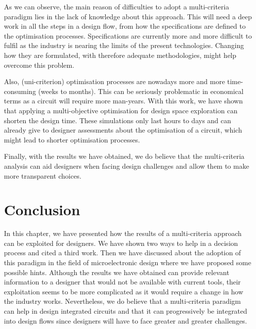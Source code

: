 As we can observe, the main reason of difficulties to adopt a multi-criteria paradigm lies in the lack of knowledge about this approach. This will need a deep work in all the steps in a design flow, from how the specifications are defined to the optimisation processes. Specifications are currently more and more difficult to fulfil as the industry is nearing the limits of the present technologies. Changing how they are formulated, with therefore adequate methodologies, might help overcome this problem.

Also, (uni-criterion) optimisation processes are nowadays more and more time-consuming (weeks to months). This can be seriously problematic in economical terms as a circuit will require more man-years. With this work, we have shown that applying a multi-objective optimisation for design space exploration can shorten the design time. These simulations only last hours to days and can already give to designer assessments about the optimisation of a circuit, which might lead to shorter optimisation processes.

Finally, with the results we have obtained, we do believe that the multi-criteria analysis can aid designers when facing design challenges and allow them to make more transparent choices.

\section{Conclusion}
In this chapter, we have presented how the results of a multi-criteria approach can be exploited for designers. We have shown two ways to help in a decision process and cited a third work. Then we have discussed about the adoption of this paradigm in the field of microelectronic design where we have proposed some possible hints. Although the results we have obtained can provide relevant information to a designer that would not be available with current tools, their exploitation seems to be more complicated as it would require a change in how the industry works. Nevertheless, we do believe that a multi-criteria paradigm can help in design integrated circuits and that it can progressively be integrated into design flows since designers will have to face greater and greater challenges.